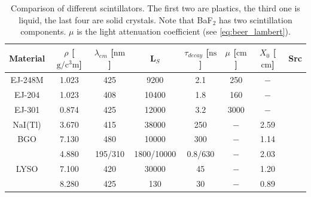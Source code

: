 \begin{table}[b]
	\centering
	\begin{tabular}{ cccccccc } \toprule[2pt]
		Material & $\rho$ [$\si{\gram}/\si{\cubic\centi\meter}$] & $\lambda_{em}$ [$\si{\nano\meter}$] & L$_{S}$ & $\tau_{decay}$ [$\si{\nano\second}$] & $\mu$ [$\si{\centi\meter}$] & $X_0$ [$\si{\centi\meter}$] & Src \\ \midrule
		EJ-248M & 1.023 & 425 & 9200 & 2.1 & 250 & $-$ &  \cite{eljen}\\
		EJ-204  & 1.023 & 408 & 10400 & 1.8 & 160 & $-$ & \cite{eljen}\\
		EJ-301  & 0.874 & 425 & 12000 & 3.2 & 3000 & $-$ & \cite{eljen} \\ 
		NaI(Tl) & 3.670 & 415 & 38000 & 250 & $-$ & 2.59 & \cite{saint-gobain} \\
		BGO & 7.130 & 480 & 10000 & 300 & $-$ & 1.14 & \cite{saint-gobain} \\
		\baf & 4.880 & 195/310 & 1800/10000 & 0.8/630 & $-$ & 2.03 & \cite{saint-gobain} \\
		LYSO & 7.100 & 420 & 30000 & 45 & $-$ & 1.20 & \cite{saint-gobain} \\
		\pwo & 8.280 & 425 & 130 & 30 & $-$ & 0.89 & \cite{wermes} \\ \bottomrule[2pt]
	\end{tabular}
	\caption[Comparison of different scintillators]{Comparison of different scintillators. The first two are plastics, the third one is liquid, the last four are solid crystals. Note that BaF$_2$ has two scintillation components. $\mu$ is the light attenuation coefficient (see \eqref{eq:beer_lambert}).}
	\label{ch2:tab:characteristics}
\end{table}





























